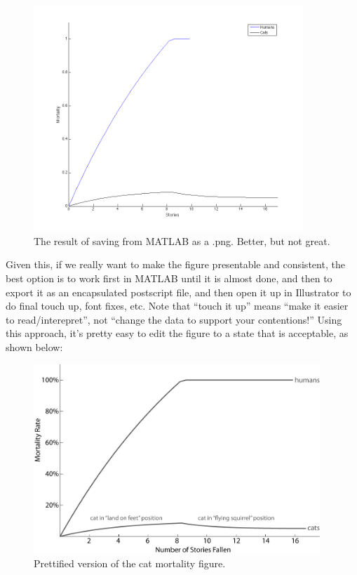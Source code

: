 \begin{figure}[h!]
\includegraphics[width=4in]{figs/LessUglyCatFigure}
\caption{The result of saving from MATLAB as a .png.  Better, but not great.}
\end{figure} 



Given this, if we really want to make the figure presentable and consistent, the best option is to work first in MATLAB until it is almost done, and then to export it as an encapsulated postscript file, and then open it up in Illustrator to do final touch up, font fixes, etc.  Note that ``touch it up'' means ``make it easier to read/interepret'',  not ``change the data to support your contentions!''  Using this approach, it's pretty easy to edit the figure to a state that is acceptable, as shown below:

 \begin{figure}[h!]
\includegraphics[width=4.25in]{figs/CatMortalityPrettified}
\caption{Prettified version of the cat mortality figure.}
\end{figure}
 
